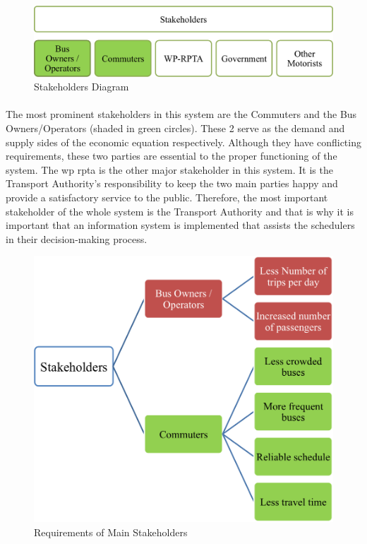 \begin {figure} [H]
\centering
\includegraphics[scale=0.75]{stakeholdersDiagram}
\caption [Stakeholders Diagram] {Stakeholders Diagram}
\label {image-stakeholdersDiagram}
\end {figure}

\paragraph{} The most prominent stakeholders in this system are the Commuters and the Bus Owners/Operators (shaded in green circles). These 2 serve as the demand and supply sides of the economic equation respectively. Although they have conflicting requirements, these two parties are essential to the proper functioning of the system. The \acrshort{wp} \acrshort{rpta} is the other major stakeholder in this system. It is the Transport Authority's responsibility to keep the two main parties happy and provide a satisfactory service to the public. Therefore, the most important stakeholder of the whole system is the Transport Authority and that is why it is important that an information system is implemented that assists the schedulers in their decision-making process. 

\begin {figure} [H]
\centering
\includegraphics[scale=0.8]{mainStakeholdersDiagram}
\caption [Requirements of Main Stakeholders] {Requirements of Main Stakeholders}
\label {image-mainStakeholdersDiagram}
\end {figure}

